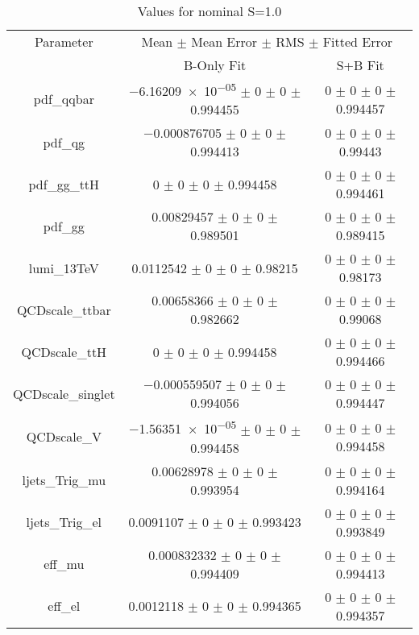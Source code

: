 \begin{table}
\centering
\caption{Values for nominal S=1.0}
\begin{tabular}{ccc}
\toprule
Parameter 	& \multicolumn{2}{c}{Mean $\pm$ Mean Error $\pm$ RMS $\pm$ Fitted Error}\\
 	& B-Only Fit & S+B Fit\\
\midrule
pdf\_qqbar 	& \num{-6.16209e-05} $\pm$ \num{0} $\pm$ \num{0} $\pm$ \num{0.994455} 	& \num{0} $\pm$ \num{0} $\pm$ \num{0} $\pm$ \num{0.994457}\\
pdf\_qg 	& \num{-0.000876705} $\pm$ \num{0} $\pm$ \num{0} $\pm$ \num{0.994413} 	& \num{0} $\pm$ \num{0} $\pm$ \num{0} $\pm$ \num{0.99443}\\
pdf\_gg\_ttH 	& \num{0} $\pm$ \num{0} $\pm$ \num{0} $\pm$ \num{0.994458} 	& \num{0} $\pm$ \num{0} $\pm$ \num{0} $\pm$ \num{0.994461}\\
pdf\_gg 	& \num{0.00829457} $\pm$ \num{0} $\pm$ \num{0} $\pm$ \num{0.989501} 	& \num{0} $\pm$ \num{0} $\pm$ \num{0} $\pm$ \num{0.989415}\\
lumi\_13TeV 	& \num{0.0112542} $\pm$ \num{0} $\pm$ \num{0} $\pm$ \num{0.98215} 	& \num{0} $\pm$ \num{0} $\pm$ \num{0} $\pm$ \num{0.98173}\\
QCDscale\_ttbar 	& \num{0.00658366} $\pm$ \num{0} $\pm$ \num{0} $\pm$ \num{0.982662} 	& \num{0} $\pm$ \num{0} $\pm$ \num{0} $\pm$ \num{0.99068}\\
QCDscale\_ttH 	& \num{0} $\pm$ \num{0} $\pm$ \num{0} $\pm$ \num{0.994458} 	& \num{0} $\pm$ \num{0} $\pm$ \num{0} $\pm$ \num{0.994466}\\
QCDscale\_singlet 	& \num{-0.000559507} $\pm$ \num{0} $\pm$ \num{0} $\pm$ \num{0.994056} 	& \num{0} $\pm$ \num{0} $\pm$ \num{0} $\pm$ \num{0.994447}\\
QCDscale\_V 	& \num{-1.56351e-05} $\pm$ \num{0} $\pm$ \num{0} $\pm$ \num{0.994458} 	& \num{0} $\pm$ \num{0} $\pm$ \num{0} $\pm$ \num{0.994458}\\
ljets\_Trig\_mu 	& \num{0.00628978} $\pm$ \num{0} $\pm$ \num{0} $\pm$ \num{0.993954} 	& \num{0} $\pm$ \num{0} $\pm$ \num{0} $\pm$ \num{0.994164}\\
ljets\_Trig\_el 	& \num{0.0091107} $\pm$ \num{0} $\pm$ \num{0} $\pm$ \num{0.993423} 	& \num{0} $\pm$ \num{0} $\pm$ \num{0} $\pm$ \num{0.993849}\\
eff\_mu 	& \num{0.000832332} $\pm$ \num{0} $\pm$ \num{0} $\pm$ \num{0.994409} 	& \num{0} $\pm$ \num{0} $\pm$ \num{0} $\pm$ \num{0.994413}\\
eff\_el 	& \num{0.0012118} $\pm$ \num{0} $\pm$ \num{0} $\pm$ \num{0.994365} 	& \num{0} $\pm$ \num{0} $\pm$ \num{0} $\pm$ \num{0.994357}\\

\end{tabular}
\end{table}
